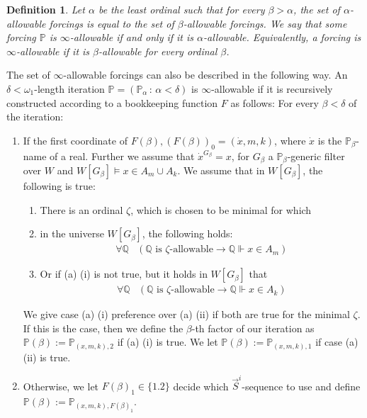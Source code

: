 \documentclass[a4paper,11pt]{article}
\newtheorem{definition}[theorem]{Definition}
\newcommand{\forceP}{\mathbb{P}}
\newcommand{\forceQ}{\mathbb{Q}}
\begin{document}
\begin{definition}
Let $\alpha$ be the least ordinal such that for every $\beta> \alpha$, the set of $\alpha$-allowable forcings is equal to the set of $\beta$-allowable forcings. We say that some forcing $\forceP$ is $\infty$-allowable if and only if it is $\alpha$-allowable. Equivalently, a forcing is $\infty$-allowable if it is $\beta$-allowable for every ordinal $\beta$.
\end{definition}
The set of $\infty$-allowable forcings can also be described in the following way. An $\delta < \omega_1$-length iteration $\forceP= (\forceP_{\alpha} \, : \, \alpha< \delta)$ is $\infty$-allowable if it is recursively constructed according to a bookkeeping function $F$ as follows: For every $\beta< \delta$ of the iteration:
\begin{enumerate}
\item[(a)] If the first coordinate of $F(\beta) ,(F(\beta))_0=(\dot{x},m,k)$, where $\dot{x}$ is the $\forceP_{\beta}$-name of a real. Further we assume that $\dot{x}^{G_{\beta}}=x$, for $G_{\beta}$ a $\forceP_{\beta}$-generic filter over $W$ and $W[G_{\beta}] \models x \in A_m \cup A_k$. 
We assume
 that in $W[G_{\beta}]$, the following is true:
\begin{enumerate}
\item[] There is an ordinal $\zeta$, which is chosen to be minimal for which
\item[(i)] 
in the universe $W[G_{\beta}]$, the following holds:
\begin{align*}
 \forall \forceQ &(\forceQ \text{ is } \zeta\text{-allowable}
 \rightarrow \forceQ \Vdash x \in A_m)
\end{align*}
\item[(ii)]
 Or if (a) (i) is not true, but it holds in $W[G_{\beta}]$ that
\begin{align*}
 \forall \forceQ &(\forceQ \text{ is } \zeta\text{-allowable} \rightarrow
 \forceQ \Vdash x \in A_k)
\end{align*}
\end{enumerate}
We give case (a) (i) preference over (a) (ii) if both are true for the minimal $\zeta$.
If this is the case, then we define the $\beta$-th factor of our iteration as $\forceP(\beta):= \forceP_{(x,m,k),2}$ if (a) (i) is true. We let
$\forceP(\beta):= \forceP_{(x,m,k),1}$ if case (a) (ii) is true.

\item[(b)] Otherwise, we let $F(\beta)_1\in \{1.2\}$ decide which $\vec{S}^i$-sequence to use and define
$\forceP(\beta):= \forceP_{(x,m,k),F(\beta)_1}$.
\end{enumerate}
\end{document}
